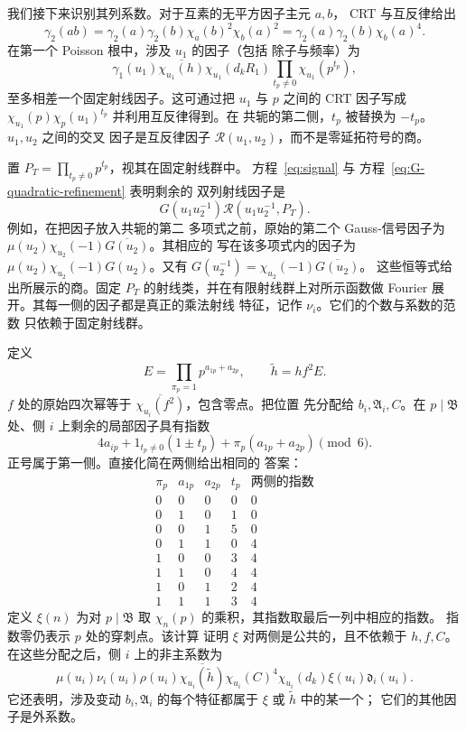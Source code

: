 我们接下来识别其列系数。对于互素的无平方因子主元 \(a,b\)，
CRT 与互反律给出
\[
 \gamma_2(ab)=\gamma_2(a)\gamma_2(b)
       \chi_a(b)^2\chi_b(a)^2
 =\gamma_2(a)\gamma_2(b)\chi_b(a)^4.
\]
在第一个 Poisson 根中，涉及 \(u_1\) 的因子（包括
除子与频率）为
\[
 \gamma_1(u_1)\overline{\chi_{u_1}(h)}
 \chi_{u_1}(d_kR_1)\prod_{t_p\ne0}\chi_{u_1}(p^{t_p}),
\]
至多相差一个固定射线因子。这可通过把
\(u_1\) 与 \(p\) 之间的 CRT 因子写成
\(\chi_{u_1}(p)\chi_p(u_1)^{t_p}\) 并利用互反律得到。在
共轭的第二侧，\(t_p\) 被替换为 \(-t_p\)。\(u_1,u_2\) 之间的交叉
因子是互反律因子
\(\mathcal R(u_1,u_2)\)，而不是零延拓符号的商。

置 \(P_T=\prod_{t_p\ne0}p^{t_p}\)，视其在固定射线群中。
方程~\eqref{eq:signal} 与
方程~\eqref{eq:G-quadratic-refinement} 表明剩余的
双列射线因子是
\[
 G(u_1u_2^{-1})\mathcal R(u_1u_2^{-1},P_T).
\]
例如，在把因子放入共轭的第二
多项式之前，原始的第二个 Gauss-信号因子为
\(\mu(u_2)\chi_{u_2}(-1)\overline{G(u_2)}\)。其相应的
写在该多项式内的因子为
\(\mu(u_2)\chi_{u_2}(-1)G(u_2)\)。又有
\(G(u_2^{-1})=\chi_{u_2}(-1)\overline{G(u_2)}\)。
这些恒等式给出所展示的商。固定
\(P_T\) 的射线类，并在有限射线群上对所示函数做 Fourier 展开。其每一侧的因子都是真正的乘法射线
特征，记作 \(\nu_i\)。它们的个数与系数的范数
只依赖于固定射线群。

定义
\[
 E=\prod_{\pi_p=1}p^{a_{1p}+a_{2p}},\qquad
 \widetilde h=hf^2E.
\]
\(f\) 处的原始四次幂等于
\(\overline{\chi_{u_i}(f^2)}\)，包含零点。把位置
先分配给 \(b_i,\mathfrak A_i,C\)。在 \(p\mid\mathfrak B\) 处、侧 \(i\) 上剩余的局部因子具有指数
\[
 4a_{ip}+1_{t_p\ne0}(1\mathbin{\pm}t_p)
          +\pi_p(a_{1p}+a_{2p})\pmod6.
\]
正号属于第一侧。直接化简在两侧给出相同的
答案：
\[
 \begin{array}{c|cc|c|c}
 \pi_p&a_{1p}&a_{2p}&t_p&\text{两侧的指数}\\ \hline
 0&0&0&0&0\\
 0&1&0&1&0\\
 0&0&1&5&0\\
 0&1&1&0&4\\
 1&0&0&3&4\\
 1&1&0&4&4\\
 1&0&1&2&4\\
 1&1&1&3&4
 \end{array}
\]
定义 \(\xi(n)\) 为对 \(p\mid\mathfrak B\) 取
\(\chi_n(p)\) 的乘积，其指数取最后一列中相应的指数。
指数零仍表示 \(p\) 处的穿刺点。该计算
证明 \(\xi\) 对两侧是公共的，且不依赖于 \(h,f,C\)。
在这些分配之后，侧 \(i\) 上的非主系数为
\begin{equation}\tag{C}\label{eq:first-poisson-column}
 \mu(u_i)\nu_i(u_i)\rho(u_i)
 \overline{\chi_{u_i}(\widetilde h)}
 \chi_{u_i}(C)^4\chi_{u_i}(d_k)\xi(u_i)\mathfrak d_i(u_i).
\end{equation}
它还表明，涉及变动
\(b_i,\mathfrak A_i\) 的每个特征都属于 \(\xi\) 或 \(\widetilde h\) 中的某一个；
它们的其他因子是外系数。


